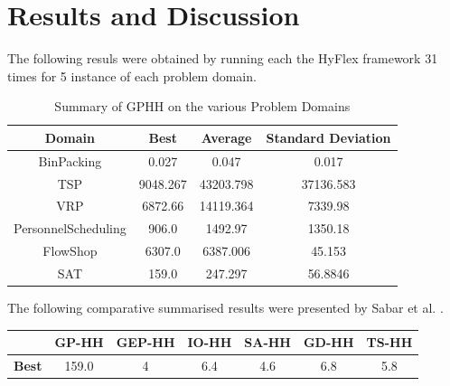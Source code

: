 \documentclass[a4paper,12pt]{article}
\begin{document}
\section{Results and Discussion} \label{sec:results}  
    \par{
        The following resuls were obtained by running each the HyFlex framework 31 times for 5 instance of each problem domain.
        \begin{table}[ht] 
                \small 
                \begin{tabular}{| c | c | c | c |} 
                    \hline
                    \textbf{Domain} & \textbf{Best} & \textbf{Average} & \textbf{Standard Deviation} \\
                    \hline
                    BinPacking & 0.027 & 0.047 & 0.017\\
                    \hline
                    TSP & 9048.267 & 43203.798 & 37136.583\\
                    \hline
                    VRP & 6872.66 & 14119.364 & 7339.98\\
                    \hline
                    PersonnelScheduling & 906.0  & 1492.97  & 1350.18\\
                    \hline
                    FlowShop &  6307.0 & 6387.006 & 45.153 \\
                    \hline
                    SAT & 159.0  & 247.297& 56.8846 \\
                    \hline  
                \end{tabular}
                \caption{Summary of GPHH on the various Problem Domains} 
        \end{table}
        \newpage
        \noindent The following comparative summarised results were presented by Sabar et al. \cite{gehh}. 
        \begin{table}[h!] 
                \small 
                \centering
                \begin{tabular}{| c | c | c | c | c| c| c|} 
                    \hline   
                    &\textbf{GP-HH} & \textbf{GEP-HH} & \textbf{IO-HH} & \textbf{SA-HH} & \textbf{GD-HH} & \textbf{TS-HH} \\
                    \hline
                    \textbf{Best} & 159.0 & 4 & 6.4 & 4.6 & 6.8 & 5.8\\

\end{tabular}
\end{table}}
\end{document}
